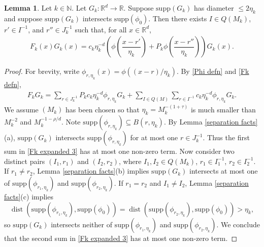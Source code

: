 \documentclass{amsart}
\numberwithin{equation}{section}
\theoremstyle{definition}
\newtheorem{lemma}[theorem]{Lemma}
\theoremstyle{definition}
\def\RR{\mathbb{R}}
\def\NN{\mathbb{N}}
\def\supp{\mathrm{supp}}
\newcommand{\rbr}[1]{\left( {#1} \right)}
\DeclareMathOperator{\dist}{dist}
\begin{document}
\begin{lemma}\label{Fk nonzero terms lemma}
Let $k \in \NN$. Let  $G_k:\RR^d \to \RR$. 
Suppose $\supp(G_k)$ has diameter $\leq 2\eta_k$ and 
suppose $\supp(G_k)$ intersects $\supp(\phi_0)$. 
Then there exists $I \in Q(M_k)$, $r' \in I^{-1}$, and $r'' \in J_k^{-1}$ 
such that, for all $x \in \RR^d$, 
\begin{align*}
F_k(x) G_k(x) = c_k \eta_k^{-d} 
\rbr{ \phi\rbr{\dfrac{x-r'}{\eta_k}} + P_k \phi\rbr{\dfrac{x-r''}{\eta_k}}}
G_k(x). 
\end{align*}
\end{lemma}
%
\begin{proof}
For brevity, write $\phi_{r,\eta_k}(x)=\phi((x-r)/\eta_k)$. 
By \eqref{Phi defn} and \eqref{Fk defn}, 
\begin{align}\label{Fk expanded 3}
F_k G_k = 
\sum_{r \in J_k^{-1}} P_k c_k  \eta_k^{-d} \phi_{r,\eta_k} G_k + 
\sum_{I \in Q(M)} \sum_{r \in I^{-1}} c_k  \eta_k^{-d} \phi_{r,\eta_k} G_k. 
\end{align}
We assume $(M_k)$ has been chosen so that  $\eta_k=M_k^{-(1+\tau)}$ is much smaller than $M_{k}^{-2}$
and $M_k^{-1-\rho/d}$. 
Note $\supp(\phi_{r,\eta_k}) \subseteq B(r,\eta_k)$. 
By Lemma \ref{separation facts}(a), $\supp(G_k)$ intersects $\supp(\phi_{r,\eta_k})$ for at most one $r \in J_k^{-1}$. 
Thus  
the first sum in \eqref{Fk expanded 3} has at most one non-zero term. 
Now consider two distinct pairs $(I_1,r_1)$ and $(I_2,r_2)$, where 
$I_1,I_2 \in Q(M_k)$, $r_1 \in I_1^{-1}$, $r_2 \in I_2^{-1}$. 
If $r_1 \neq r_2$, Lemma \ref{separation facts}(b) implies 
$\supp(G_k)$ intersects at most one of $\supp(\phi_{r_1,\eta_k})$ and $\supp(\phi_{r_2,\eta_k})$. 
If $r_1 = r_2$ and $I_1 \neq I_2$, Lemma \ref{separation facts}(c) implies 
$$
\dist(\supp(\phi_{r_1,\eta_k}),\supp(\phi_0))
= 
\dist(\supp(\phi_{r_2,\eta_k}),\supp(\phi_0))
> 
\eta_k,$$
so $\supp(G_k)$ intersects neither of $\supp(\phi_{r_1,\eta_k})$ and $\supp(\phi_{r_2,\eta_k})$. 
We conclude that the second sum in \eqref{Fk expanded 3} has at most one non-zero term. 
\end{proof}
\end{document}
